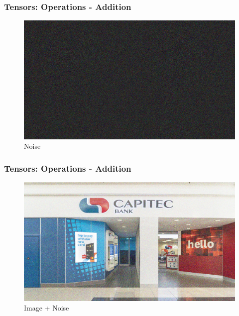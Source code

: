 \documentclass[11pt]{beamer}
\begin{document}
\begin{frame}
	\frametitle{Tensors: Operations - Addition}
	\begin{figure}
		\includegraphics[scale=0.17]{"2 - gauss_noise"}
		\caption{Noise}
	\end{figure}
\end{frame}

\begin{frame}
	\frametitle{Tensors: Operations - Addition}
	\begin{figure}
		\includegraphics[scale=0.17]{"3 - gn_img"}
		\caption{Image + Noise}
	\end{figure}
\end{frame}
\end{document}

